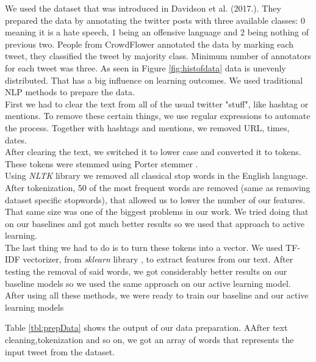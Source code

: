 \documentclass[10pt, a4paper]{article}
\begin{document}
We used the dataset that was introduced in Davidson et al. (2017.). They prepared the data by annotating the twitter posts with three available classes: 0 meaning it is a hate speech, 1 being an offensive language and 2 being nothing of previous two. People from CrowdFlower annotated the data by marking each tweet, they classified the tweet by majority class. Minimum number of annotators for each tweet was three.
As seen in Figure \ref{fig:histofdata} data is unevenly distributed. That has a big influence on learning outcomes. We used traditional NLP methods to prepare the data.
\\First we had to clear the text from all of the usual twitter "stuff", like hashtag or mentions. To remove these certain things, we use regular expressions to automate the process. Together with hashtags and mentions, we removed URL, times, dates.
\\After clearing the text, we switched it to lower case and converted it to tokens. These tokens were stemmed using Porter stemmer \citep{PorterStemmer}.
\\Using \textit{NLTK} library \citep{NLTK} we removed all classical stop words in the English language. After tokenization, 50 of the most frequent words are removed (same as removing dataset specific stopwords), that allowed us to lower the number of our features. That same size was one of the biggest problems in our work.
We tried doing that on our baselines and got much better results so we used that approach to active learning.
\\The last thing we had to do is to turn these tokens into a vector. We used TF-IDF vectorizer, from \textit{sklearn} library \citep{scikit-learn}, to extract features from our text. After testing the removal of said words, we got considerably better results on our baseline models so we used the same approach on our active learning model.
After using all these methods, we were ready to train our baseline and our active learning models

Table \ref{tbl:prepData} shows the output of our data preparation. AAfter text cleaning,tokenization and so on, we got an array of words that represents the input tweet from the dataset.
\end{document}
